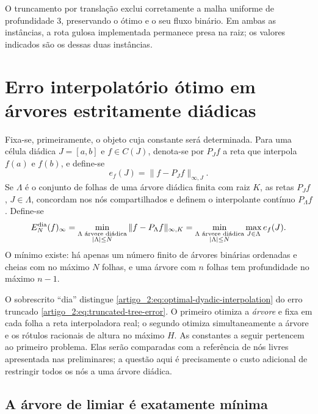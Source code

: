 \documentclass[12pt,a4paper]{article}
\theoremstyle{preciso}
\theoremstyle{definition}
\theoremstyle{preciso}
\theoremstyle{preciso}
\theoremstyle{preciso}
\theoremstyle{preciso}
\theoremstyle{definition}
\theoremstyle{preciso}
\theoremstyle{definition}
\theoremstyle{preciso}
\theoremstyle{preciso}
\theoremstyle{definition}
\begin{document}
O truncamento por translação exclui corretamente a malha uniforme de
profundidade $3$, preservando o ótimo e o seu fluxo binário. Em ambas as
instâncias, a rota gulosa implementada permanece presa na raiz; os valores indicados são os dessas duas instâncias.

\section{Erro interpolatório ótimo em árvores estritamente diádicas}
\label{artigo_2:sec:dyadic-asymptotic}

Fixa-se, primeiramente, o objeto cuja constante será determinada. Para uma célula
diádica $J=[a,b]$ e $f\in C(J)$, denota-se por $P_Jf$ a reta que interpola
$f(a)$ e $f(b)$, e define-se
\begin{equation}
 e_f(J)=\|f-P_Jf\|_{\infty,J}.
 \label{artigo_2:eq:local-interpolation-error}
\end{equation}
Se $\Lambda$ é o conjunto de folhas de uma árvore diádica finita com raiz
$K$, as retas $P_Jf$, $J\in\Lambda$, concordam nos nós compartilhados e
definem o interpolante contínuo $P_\Lambda f$. Define-se
\begin{equation}
 E_N^{\rm dia}(f)_\infty
 =\min_{\substack{\Lambda\text{ árvore diádica}\\ |\Lambda|\le N}}
   \|f-P_\Lambda f\|_{\infty,K}
 =\min_{\substack{\Lambda\text{ árvore diádica}\\ |\Lambda|\le N}}
   \max_{J\in\Lambda}e_f(J).
 \label{artigo_2:eq:optimal-dyadic-interpolation}
\end{equation}
O mínimo existe: há apenas um número finito de árvores binárias ordenadas e
cheias com no máximo $N$ folhas, e uma árvore com $n$ folhas tem profundidade
no máximo $n-1$.

O sobrescrito ``dia'' distingue \eqref{artigo_2:eq:optimal-dyadic-interpolation} do
erro truncado \eqref{artigo_2:eq:truncated-tree-error}. O primeiro otimiza a
\emph{árvore} e fixa em cada folha a reta interpoladora real; o segundo
otimiza simultaneamente a árvore e os rótulos racionais de altura no máximo $H$.
As constantes a seguir pertencem ao primeiro problema.
Elas serão comparadas com a referência de nós livres apresentada nas preliminares; a questão aqui é precisamente o custo adicional de
restringir todos os nós a uma árvore diádica.

\subsection{A árvore de limiar é exatamente mínima}
\end{document}
